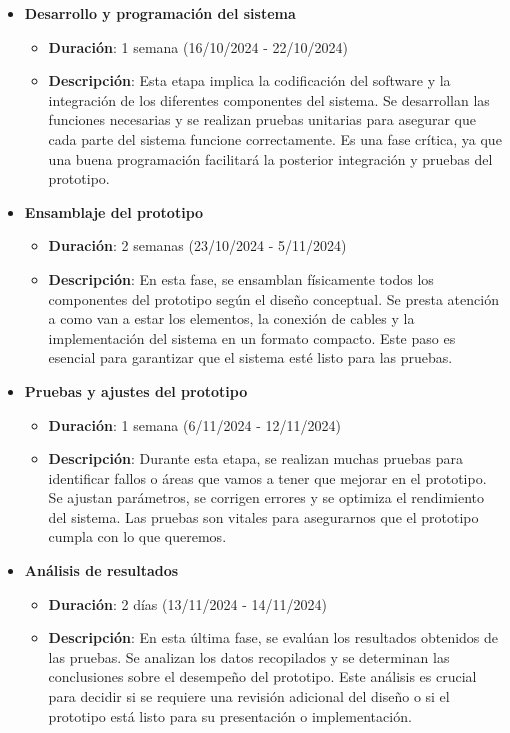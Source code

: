 \begin{itemize}
    \item \textbf{Desarrollo y programación del sistema}
    \begin{itemize}
        \item \textbf{Duración}: 1 semana (16/10/2024 - 22/10/2024)
        \item \textbf{Descripción}: Esta etapa implica la codificación del software y la integración de los diferentes componentes del sistema. Se desarrollan las funciones necesarias y se realizan pruebas unitarias para asegurar que cada parte del sistema funcione correctamente. Es una fase crítica, ya que una buena programación facilitará la posterior integración y pruebas del prototipo.
    \end{itemize}
    \newpage
    \item \textbf{Ensamblaje del prototipo}
    \begin{itemize}
        \item \textbf{Duración}: 2 semanas (23/10/2024 - 5/11/2024)
        \item \textbf{Descripción}: En esta fase, se ensamblan físicamente todos los componentes del prototipo según el diseño conceptual. Se presta atención a como van a estar los elementos, la conexión de cables y la implementación del sistema en un formato compacto. Este paso es esencial para garantizar que el sistema esté listo para las pruebas.
    \end{itemize}
    \item \textbf{Pruebas y ajustes del prototipo}
    \begin{itemize}
        \vspace{-1.1cm}
        \item \textbf{Duración}: 1 semana (6/11/2024 - 12/11/2024)
        \item \textbf{Descripción}: Durante esta etapa, se realizan muchas pruebas para identificar fallos o áreas que vamos a tener que mejorar en el prototipo. Se ajustan parámetros, se corrigen errores y se optimiza el rendimiento del sistema. Las pruebas son vitales para asegurarnos que el prototipo cumpla con lo que queremos.
    \end{itemize}
    \item \textbf{Análisis de resultados}
    \begin{itemize}
        \item \textbf{Duración}: 2 días (13/11/2024 - 14/11/2024)
        \item \textbf{Descripción}: En esta última fase, se evalúan los resultados obtenidos de las pruebas. Se analizan los datos recopilados y se determinan las conclusiones sobre el desempeño del prototipo. Este análisis es crucial para decidir si se requiere una revisión adicional del diseño o si el prototipo está listo para su presentación o implementación.
    \end{itemize}
\end{itemize}
